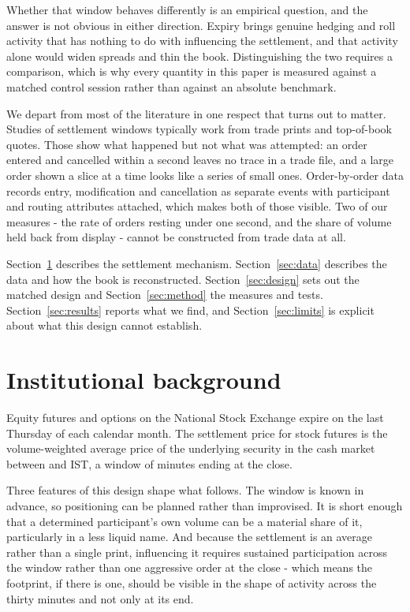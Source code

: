 \documentclass[11pt,a4paper]{article}
\begin{document}
Whether that window behaves differently is an empirical question, and the answer is not
obvious in either direction. Expiry brings genuine hedging and roll activity that has
nothing to do with influencing the settlement, and that activity alone would widen spreads
and thin the book. Distinguishing the two requires a comparison, which is why every
quantity in this paper is measured against a matched control session rather than against an
absolute benchmark.

We depart from most of the literature in one respect that turns out to matter. Studies of
settlement windows typically work from trade prints and top-of-book quotes. Those show what
happened but not what was attempted: an order entered and cancelled within a second leaves
no trace in a trade file, and a large order shown a slice at a time looks like a series of
small ones. Order-by-order data records entry, modification and cancellation as separate
events with participant and routing attributes attached, which makes both of those visible.
Two of our measures - the rate of orders resting under one second, and the share of volume
held back from display - cannot be constructed from trade data at all.

Section~\ref{sec:background} describes the settlement mechanism. Section~\ref{sec:data}
describes the data and how the book is reconstructed. Section~\ref{sec:design} sets out the
matched design and Section~\ref{sec:method} the measures and tests.
Section~\ref{sec:results} reports what we find, and Section~\ref{sec:limits} is explicit
about what this design cannot establish.


\section{Institutional background}\label{sec:background}

Equity futures and options on the National Stock Exchange expire on the last Thursday of
each calendar month. The settlement price for stock futures is the volume-weighted average
price of the underlying security in the cash market between \DesignWindowStart{} and
\DesignWindowEnd{} IST, a window of \DesignWindowMinutes{} minutes ending at the close.

Three features of this design shape what follows. The window is known in advance, so
positioning can be planned rather than improvised. It is short enough that a determined
participant's own volume can be a material share of it, particularly in a less liquid name.
And because the settlement is an average rather than a single print, influencing it requires
sustained participation across the window rather than one aggressive order at the close -
which means the footprint, if there is one, should be visible in the shape of activity
across the thirty minutes and not only at its end.
\end{document}
